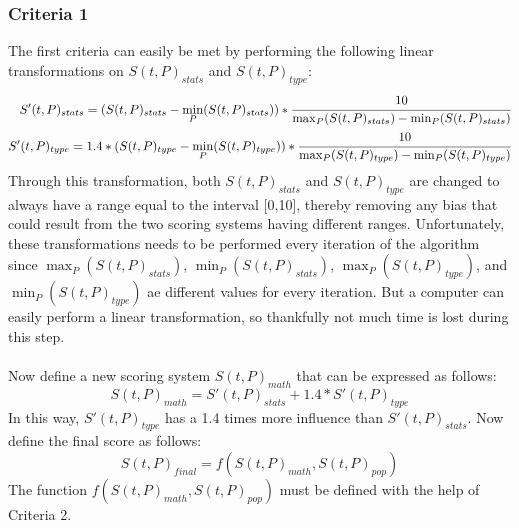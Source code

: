 \documentclass{article}
\begin{document}
\subsubsection{Criteria 1}
The first criteria can easily be met by performing the following linear transformations on $S(t,P)_{stats}$ and $S(t,P)_{type}$:
\begin{eqnarray*}
	S'(t,P)_{stats}=(S(t,P)_{stats}-\min_P(S(t,P)_{stats}))*\cfrac{10}{\max_P(S(t,P)_{stats})-\min_P(S(t,P)_{stats})}\\
	S'(t,P)_{type}=1.4*(S(t,P)_{type}-\min_P(S(t,P)_{type}))*\cfrac{10}{\max_P(S(t,P)_{type})-\min_P(S(t,P)_{type})}
\end{eqnarray*}
Through this transformation, both $S(t,P)_{stats}$ and $S(t,P)_{type}$ are changed to always have a range equal to the interval [0,10], thereby removing any bias that could result from the two scoring systems having different ranges. Unfortunately, these transformations needs to be performed every iteration of the algorithm since $\max_P(S(t,P)_{stats})$, $\min_P(S(t,P)_{stats})$, $\max_P(S(t,P)_{type})$, and $\min_P(S(t,P)_{type})$ ae different values for every iteration. But a computer can easily perform a linear transformation, so thankfully not much time is lost during this step.\\\\
Now define a new scoring system $S(t,P)_{math}$ that can be expressed as follows:
\begin{equation*}
	S(t,P)_{math}=S'(t,P)_{stats}+1.4*S'(t,P)_{type}
\end{equation*}
In this way, $S'(t,P)_{type}$ has a 1.4 times more influence than $S'(t,P)_{stats}$. 
Now define the final score as follows:
\begin{equation*}
	S(t,P)_{final}=f(S(t,P)_{math},S(t,P)_{pop})
\end{equation*}
The function $f(S(t,P)_{math},S(t,P)_{pop})$ must be defined with the help of Criteria 2.
\end{document}
